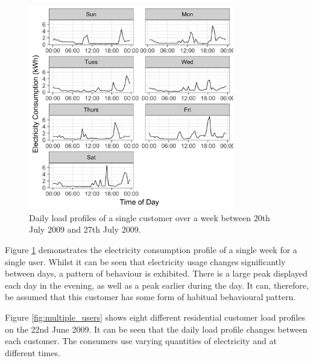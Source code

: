 \begin{figure}[b]
	\includegraphics[width=0.8\textwidth]{Chapter5/figures/Rplot01.png}
	\caption{Daily load profiles of a single customer over a week between 20th July 2009 and 27th July 2009. }
	\label{fig:single_user}
\end{figure}

Figure \ref{fig:single_user} demonstrates the electricity consumption profile of a single week for a single user. Whilst it can be seen that electricity usage changes significantly between days, a pattern of behaviour is exhibited. There is a large peak displayed each day in the evening, as well as a peak earlier during the day. It can, therefore, be assumed that this customer has some form of habitual behavioural pattern. 

Figure \ref{fig:multiple_users} shows eight different residential customer load profiles on the 22nd June 2009. It can be seen that the daily load profile changes between each customer. The consumers use varying quantities of electricity and at different times. 




